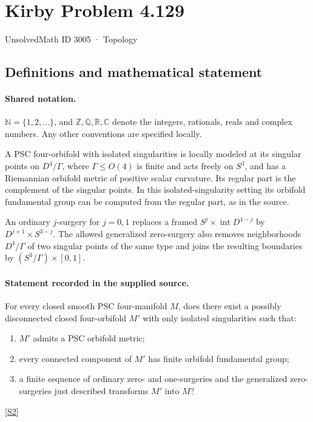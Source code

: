 \documentclass[11pt]{article}
\newcommand{\sref}[2]{\hyperlink{source:#1:#2}{[S#2]}}
\begin{document}
\setcounter{section}{3004}
\section{Kirby Problem 4.129}\label{3005}
{\small\sffamily UnsolvedMath ID 3005 · Topology}
\subsection{Definitions and mathematical statement}

\paragraph{Shared notation.}$\mathbb N=\{1,2,\ldots\}$, and $\mathbb Z,\mathbb Q,\mathbb R,\mathbb C$ denote the integers, rationals, reals and complex numbers. Any other conventions are specified locally.


A PSC four-orbifold with isolated singularities is locally modeled at its singular points on $D^4/\Gamma$, where $\Gamma\leq O(4)$ is finite and acts freely on $S^3$, and has a Riemannian orbifold metric of positive scalar curvature. Its regular part is the complement of the singular points. In this isolated-singularity setting its orbifold fundamental group can be computed from the regular part, as in the source.

An ordinary $j$-surgery for $j=0,1$ replaces a framed $S^j\times\operatorname{int}D^{4-j}$ by $D^{j+1}\times S^{3-j}$. The allowed generalized zero-surgery also removes neighborhoods $D^4/\Gamma$ of two singular points of the same type and joins the resulting boundaries by $(S^3/\Gamma)\times[0,1]$.
\paragraph{Statement recorded in the supplied source.}
For every closed smooth PSC four-manifold $M$, does there exist a possibly disconnected closed four-orbifold $M'$ with only isolated singularities such that:
\begin{enumerate}
\item $M'$ admits a PSC orbifold metric;
\item every connected component of $M'$ has finite orbifold fundamental group;
\item a finite sequence of ordinary zero- and one-surgeries and the generalized zero-surgeries just described transforms $M'$ into $M$?
\end{enumerate} \sref{3005}{2}
\end{document}
